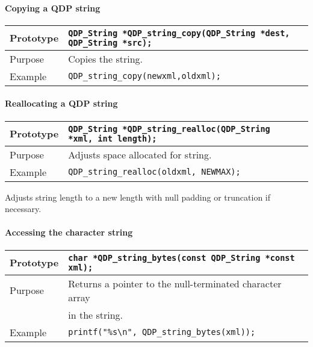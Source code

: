 \documentclass{article}
\newcommand{\QMDhandle}{{\tt QDP\_String }}
\begin{document}
\paragraph{Copying a QDP string}

\begin{flushleft}
  \begin{tabular}{|l|l|}
  \hline
  Prototype      & \QMDhandle \verb|*QDP_string_copy(|\QMDhandle \verb|*dest,| \QMDhandle \verb|*src);|\\
    \hline
  Purpose        & Copies the string. \\
   \hline
  Example        & \verb|QDP_string_copy(newxml,oldxml);| \\
   \hline
 \end{tabular}
\end{flushleft}
%
\paragraph{Reallocating a QDP string}

\begin{flushleft}
  \begin{tabular}{|l|l|}
  \hline
  Prototype      & \QMDhandle \verb|*QDP_string_realloc(|\QMDhandle \verb| *xml, int length);|\\
    \hline
  Purpose        & Adjusts space allocated for string. \\
   \hline
  Example        & \verb|QDP_string_realloc(oldxml, NEWMAX);| \\
   \hline
 \end{tabular}
\end{flushleft}
Adjusts string length to a new length with null padding or truncation
if necessary.
%
\paragraph{Accessing the character string}

\begin{flushleft}
  \begin{tabular}{|l|l|}
  \hline
  Prototype      & \verb|char *QDP_string_bytes(const |\QMDhandle \verb|*const xml);|\\
    \hline
  Purpose        & Returns a pointer to the null-terminated character array \\
                 & in the string. \\
   \hline
  Example        & \verb|printf("%s\n", QDP_string_bytes(xml));| \\
   \hline
 \end{tabular}
\end{flushleft}
%
\end{document}
